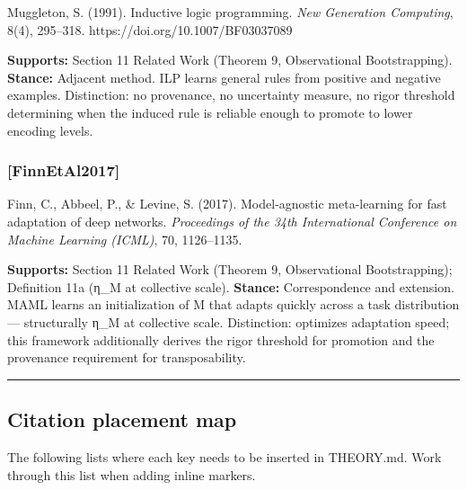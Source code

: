 \documentclass[
]{article}
\begin{document}
Muggleton, S. (1991). Inductive logic programming. \emph{New Generation
Computing}, 8(4), 295--318. https://doi.org/10.1007/BF03037089

\textbf{Supports:} Section 11 Related Work (Theorem 9, Observational
Bootstrapping). \textbf{Stance:} Adjacent method. ILP learns general
rules from positive and negative examples. Distinction: no provenance,
no uncertainty measure, no rigor threshold determining when the induced
rule is reliable enough to promote to lower encoding levels.

\subsubsection{{[}FinnEtAl2017{]}}\label{finnetal2017}

Finn, C., Abbeel, P., \& Levine, S. (2017). Model-agnostic meta-learning
for fast adaptation of deep networks. \emph{Proceedings of the 34th
International Conference on Machine Learning (ICML)}, 70, 1126--1135.

\textbf{Supports:} Section 11 Related Work (Theorem 9, Observational
Bootstrapping); Definition 11a (η\_M at collective scale).
\textbf{Stance:} Correspondence and extension. MAML learns an
initialization of M that adapts quickly across a task distribution ---
structurally η\_M at collective scale. Distinction: optimizes adaptation
speed; this framework additionally derives the rigor threshold for
promotion and the provenance requirement for transposability.

\begin{center}\rule{0.5\linewidth}{0.5pt}\end{center}

\subsection{Citation placement map}\label{citation-placement-map}

The following lists where each key needs to be inserted in THEORY.md.
Work through this list when adding inline markers.
\end{document}
